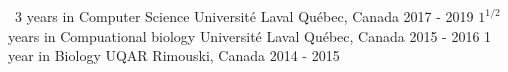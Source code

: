 


\begin{cventries}


\cventry
{\ 3 years in Computer Science} %
{Université Laval} %
{Québec, Canada} %
{2017 - 2019} %
{ %
}
\cventry
{$1^{1/2}$ years in Compuational biology} %
{Université Laval} %
{Québec, Canada} %
{2015 - 2016} %
{ %
}
\cventry
{1 year in Biology} %
{UQAR} %
{Rimouski, Canada} %
{2014 - 2015} %
{ %
}

\end{cventries}